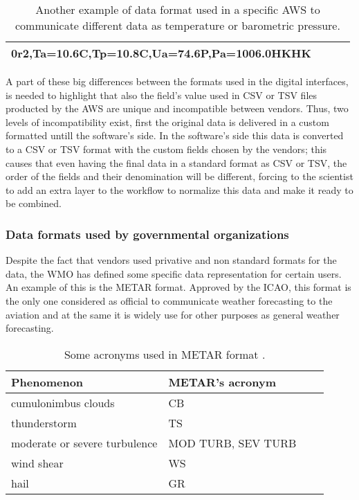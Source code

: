\begin{table}[hc]
\centering
\begin{tabular}{ | l | l | l | l |}
\hline    
0r2,Ta=10.6C,Tp=10.8C,Ua=74.6P,Pa=1006.0HKHK\\
\hline
\end{tabular}
\caption{Another example of data format used in a specific \protect \gls{AWS} to communicate different data as temperature or barometric pressure.}
\end{table}

A part of these big differences between the formats used in the digital interfaces, is needed to highlight that also the field's value used in \gls{CSV} or \gls{TSV} files producted by the \gls{AWS} are unique and incompatible between vendors. Thus, two levels of incompatibility exist, first the original data is delivered in a custom formatted untill the software's side. In the software's side this data is converted to a \gls{CSV} or \gls{TSV} format with the custom fields chosen by the vendors; this causes that even having the final data in a standard format as \gls{CSV} or \gls{TSV}, the order of the fields and their denomination will be different, forcing to the scientist to add an extra layer to the workflow to normalize this data and make it ready to be combined.

\subsubsection{Data formats used by governmental organizations}

Despite the fact that vendors used privative and non standard formats for the data, the \gls{WMO} has defined some specific data representation for certain users. An example of this is the \gls{METAR} format. Approved by the \gls{ICAO}, this format is the only one considered as official to communicate weather forecasting to the aviation and at the same it is widely use for other purposes as general weather forecasting.

\begin{table}[H]
\centering
\begin{tabular}{ | l | l | l | l |}
\hline
\textbf{Phenomenon} & \textbf{METAR's acronym} \\ \hline
cumulonimbus clouds & CB\\ \hline
thunderstorm & TS\\ \hline
moderate or severe turbulence & MOD TURB, SEV TURB\\ \hline
wind shear & WS\\ \hline
hail & GR \\ \hline
\end{tabular}
\caption{Some acronyms used in METAR format \cite{METAR}.}
\end{table}

